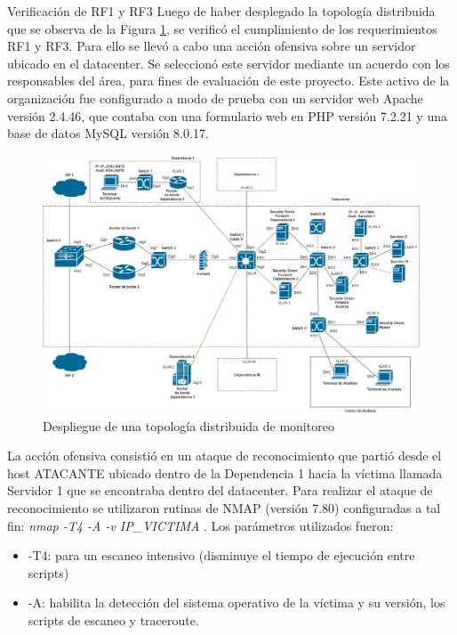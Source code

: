     \begin{section}{Verificación de RF1 y RF3}
    Luego de haber desplegado la topología distribuida que se observa de la Figura \ref{fig:iter1_ver_RF1_RF2}, se verificó el cumplimiento de los requerimientos RF1 y RF3. Para ello se llevó a cabo una acción ofensiva sobre un servidor ubicado en el datacenter. Se seleccionó este servidor mediante un acuerdo con los responsables del área, para fines de evaluación de este proyecto. Este activo de la organización fue configurado a modo de prueba con un servidor web Apache versión 2.4.46, que contaba con una formulario web en PHP versión  7.2.21  y una base de datos MySQL versión 8.0.17.\par
    \begin{figure}[H]
    \centering
    \includegraphics[width=1\textwidth]{./iteracion_1_imagenes/Topologia de despliegue descentralizada RF1 y RF3.png}
    \caption{Despliegue de una topología distribuida de monitoreo}
    \label{fig:iter1_ver_RF1_RF2}
    \end{figure}
    La acción ofensiva consistió en un ataque de reconocimiento que partió desde el host ATACANTE ubicado dentro de la Dependencia 1 hacia la víctima llamada Servidor 1 que se encontraba dentro del datacenter.
    Para realizar el ataque de reconocimiento se utilizaron rutinas de NMAP \cite{nmap} (versión 7.80) configuradas a tal fin: \textit{nmap -T4 -A -v IP\_VICTIMA} . Los parámetros utilizados fueron:
    \begin{itemize}
    \item -T4: para un escaneo intensivo (disminuye el tiempo de ejecución entre scripts)
    \item -A: habilita la detección del sistema operativo de la víctima y su versión, los scripts de escaneo y traceroute.

\end{itemize}
\end{section}
